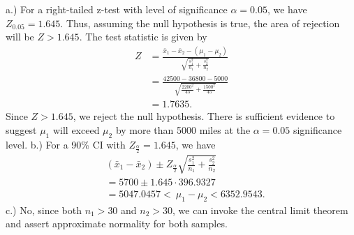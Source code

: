 \documentclass{report}
\begin{document}
 \bigbreak \noindent 
 a.) For a right-tailed z-test with level of significance $\alpha=0.05$, we have $Z_{0.05} = 1.645$. Thus, assuming the null hypothesis is true, the area of rejection will be $Z > 1.645$. The test statistic is given by
 \begin{align*}
     Z &= \frac{\bar{x}_{1} - \bar{x}_{2} - (\mu_{1} - \mu_{2})}{\sqrt{\frac{s_{1}^{2}}{n_{1}} + \frac{s_{2}^{2}}{n_{2}}}} \\
       &=\frac{42500 - 36800 - 5000}{\sqrt{\frac{2200^2}{45} + \frac{1500^2}{45}}} \\
       &=1.7635
 .\end{align*}
 \bigbreak \noindent 
 Since $Z > 1.645$, we reject the null hypothesis. There is sufficient evidence to suggest $\mu_{1}$ will exceed $\mu_{2}$ by more than 5000 miles at the $\alpha=0.05$ significance level.
 \bigbreak \noindent 
 b.) For a 90\% CI with $Z_{\frac{\alpha}{2}} = 1.645$, we have
 \begin{align*}
     &(\bar{x}_{1} - \bar{x}_{2}) \pm Z_{\frac{\alpha}{2}} \sqrt{\frac{s_{1}^{2}}{n_{1}} + \frac{s_{2}^{2}}{n_{2}}} \\
     &=5700 \pm 1.645 \cdot 396.9327 \\
     &=5047.0457 <\ \mu_{1} - \mu_{2} < 6352.9543
 .\end{align*}
 \bigbreak \noindent 
 c.) No, since both $n_{1} > 30$ and $n_{2} > 30$, we can invoke the central limit theorem and assert approximate normality for both samples.
\end{document}
